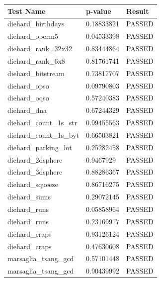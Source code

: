 \documentclass[conference]{IEEEtran}
\begin{document}
\begin{center}
\begin{table}[H]
\renewcommand{\arraystretch}{1.2}
\centering
\begin{tabular}{|l|l|l|}
\hline
Test Name                              & p-value    & Result \\ \hline
diehard\_birthdays                     & 0.18833821 & PASSED \\ \hline
diehard\_operm5                        & 0.04533398 & PASSED \\ \hline
diehard\_rank\_32x32                   & 0.83444864 & PASSED \\ \hline
diehard\_rank\_6x8                     & 0.81761741 & PASSED \\ \hline
diehard\_bitstream                     & 0.73817707 & PASSED \\ \hline
diehard\_opso                          & 0.09790803 & PASSED \\ \hline
diehard\_oqso                          & 0.57240383 & PASSED \\ \hline
diehard\_dna                           & 0.67244329 & PASSED \\ \hline
diehard\_count\_1s\_str                & 0.99455563 & PASSED \\ \hline
diehard\_count\_1s\_byt                & 0.66503821 & PASSED \\ \hline
diehard\_parking\_lot                  & 0.25282458 & PASSED \\ \hline
diehard\_2dsphere                      & 0.9467929  & PASSED \\ \hline
diehard\_3dsphere                      & 0.88286367 & PASSED \\ \hline
diehard\_squeeze                       & 0.86716275 & PASSED \\ \hline
diehard\_sums                          & 0.29072145 & PASSED \\ \hline
diehard\_runs                          & 0.05858964 & PASSED \\ \hline
diehard\_runs                          & 0.23169917 & PASSED \\ \hline
diehard\_craps                         & 0.93126124 & PASSED \\ \hline
diehard\_craps                         & 0.47630608 & PASSED \\ \hline
marsaglia\_tsang\_gcd                  & 0.57101448 & PASSED \\ \hline
marsaglia\_tsang\_gcd                  & 0.90439992 & PASSED \\ \hline

\end{tabular}
\end{table}
\end{center}
\end{document}
